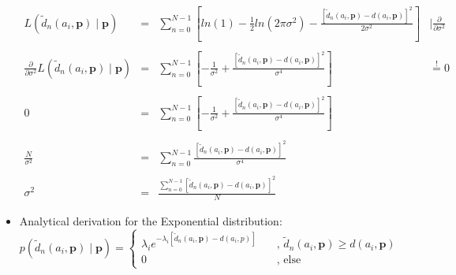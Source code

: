 \documentclass{article}
\begin{document}
\begin{itemize}
	    $\begin{array}{cccr}
	        L(\tilde{d}_n(a_i,\mathbf{p})\mid\mathbf{p}) & = & \displaystyle \sum_{n=0}^{N-1} \left[ ln(1) - \frac{1}{2}ln(2\pi\sigma^2) - \frac{[\tilde{d}_n(a_i,\mathbf{p})-d(a_i,\mathbf{p})]^2}{2\sigma^2} \right] & \mid \frac{\partial}{\partial\sigma^2} \\\\
	        \frac{\partial}{\partial\sigma^2} L(\tilde{d}_n(a_i,\mathbf{p})\mid\mathbf{p}) & = & \displaystyle \sum_{n=0}^{N-1} \left[ - \frac{1}{\sigma^2} + \frac{[\tilde{d}_n(a_i,\mathbf{p})-d(a_i,\mathbf{p})]^2}{\sigma^4} \right] & \stackrel{!}{=} 0 \\\\
	        0 & = & \displaystyle \sum_{n=0}^{N-1} \left[ - \frac{1}{\sigma^2} + \frac{[\tilde{d}_n(a_i,\mathbf{p})-d(a_i,\mathbf{p})]^2}{\sigma^4} \right] & \\\\
	        \frac{N}{\sigma^2} & = & \displaystyle \sum_{n=0}^{N-1} \frac{[\tilde{d}_n(a_i,\mathbf{p})-d(a_i,\mathbf{p})]^2}{\sigma^4} \\\\
	        \sigma^2 & = & \frac{\displaystyle \sum_{n=0}^{N-1}[\tilde{d}_n(a_i,\mathbf{p})-d(a_i,\mathbf{p})]^2}{N} 
	    \end{array}$\\
         	 
	\item Analytical derivation for the Exponential distribution:\\
	 
	    \begin{equation*}
	  	     p(\tilde{d}_n(a_i,\mathbf{p})\mid\mathbf{p}) = 
	         \begin{cases}
	             \lambda_i e^{-\lambda_i [\tilde{d}_n(a_i,\mathbf{p}) - d(a_i,p)]} & \quad \text{, }\tilde{d}_n(a_i,\mathbf{p}) \geq d(a_i,\mathbf{p}) \\
	             0 & \quad \text{, else}
	         \end{cases}
	     \end{equation*}
	    

\end{itemize}
\end{document}
